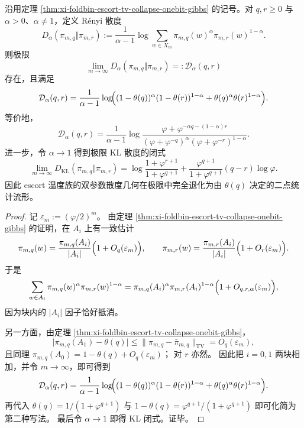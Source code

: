 \begin{theorem}\label{thm:xi-foldbin-escort-renyi-kl-two-point-closure}
沿用定理 \ref{thm:xi-foldbin-escort-tv-collapse-onebit-gibbs} 的记号。对 \(q,r\ge 0\) 与
\(\alpha>0\)、\(\alpha\neq 1\)，定义 Rényi 散度
\[
D_\alpha(\pi_{m,q}\Vert \pi_{m,r})
:=
\frac{1}{\alpha-1}
\log\sum_{w\in X_m}\pi_{m,q}(w)^\alpha \pi_{m,r}(w)^{1-\alpha}.
\]
则极限
\[
\lim_{m\to\infty}D_\alpha(\pi_{m,q}\Vert \pi_{m,r})
=:\mathcal D_\alpha(q,r)
\]
存在，且满足
\[
\mathcal D_\alpha(q,r)
=
\frac{1}{\alpha-1}
\log\!\Bigl(
(1-\theta(q))^\alpha(1-\theta(r))^{1-\alpha}
+
\theta(q)^\alpha\theta(r)^{1-\alpha}
\Bigr).
\]
等价地，
\[
\mathcal D_\alpha(q,r)
=
\frac{1}{\alpha-1}
\log
\frac{\varphi+\varphi^{-\alpha q-(1-\alpha)r}}
{(\varphi+\varphi^{-q})^\alpha(\varphi+\varphi^{-r})^{1-\alpha}}.
\]
进一步，令 \(\alpha\to 1\) 得到极限 KL 散度的闭式
\[
\lim_{m\to\infty}D_{\mathrm{KL}}(\pi_{m,q}\Vert \pi_{m,r})
=
\log\!\frac{1+\varphi^{r+1}}{1+\varphi^{q+1}}
+
\frac{\varphi^{q+1}}{1+\varphi^{q+1}}(q-r)\log\varphi.
\]
因此 escort 温度族的双参数散度几何在极限中完全退化为由 \(\theta(q)\) 决定的二点统计流形。
\end{theorem}
\begin{proof}
记
\(
\varepsilon_m:=(\varphi/2)^m
\)。
由定理 \ref{thm:xi-foldbin-escort-tv-collapse-onebit-gibbs} 的证明，在 \(A_i\) 上有一致估计
\[
\pi_{m,q}(w)
=
\frac{\pi_{m,q}(A_i)}{|A_i|}
\Bigl(1+O_q(\varepsilon_m)\Bigr),
\qquad
\pi_{m,r}(w)
=
\frac{\pi_{m,r}(A_i)}{|A_i|}
\Bigl(1+O_r(\varepsilon_m)\Bigr).
\]
于是
\[
\sum_{w\in A_i}\pi_{m,q}(w)^\alpha\pi_{m,r}(w)^{1-\alpha}
=
\pi_{m,q}(A_i)^\alpha\pi_{m,r}(A_i)^{1-\alpha}
\Bigl(1+O_{q,r,\alpha}(\varepsilon_m)\Bigr),
\]
因为块内的 \(|A_i|\) 因子恰好抵消。

另一方面，由定理 \ref{thm:xi-foldbin-escort-tv-collapse-onebit-gibbs}，
\[
\bigl|\pi_{m,q}(A_1)-\theta(q)\bigr|
\le
\|\pi_{m,q}-\bar\pi_{m,q}\|_{\mathrm{TV}}
=
O_q(\varepsilon_m),
\]
且同理
\(
\pi_{m,q}(A_0)=1-\theta(q)+O_q(\varepsilon_m)
\)；
对 \(r\) 亦然。
因此把 \(i=0,1\) 两块相加，并令 \(m\to\infty\)，即可得到
\[
\mathcal D_\alpha(q,r)
=
\frac{1}{\alpha-1}
\log\!\Bigl(
(1-\theta(q))^\alpha(1-\theta(r))^{1-\alpha}
+
\theta(q)^\alpha\theta(r)^{1-\alpha}
\Bigr).
\]
再代入
\(
\theta(q)=1/(1+\varphi^{q+1})
\)
与
\(
1-\theta(q)=\varphi^{q+1}/(1+\varphi^{q+1})
\)
即可化简为第二种写法。
最后令 \(\alpha\to 1\) 即得 KL 闭式。证毕。
\end{proof}

